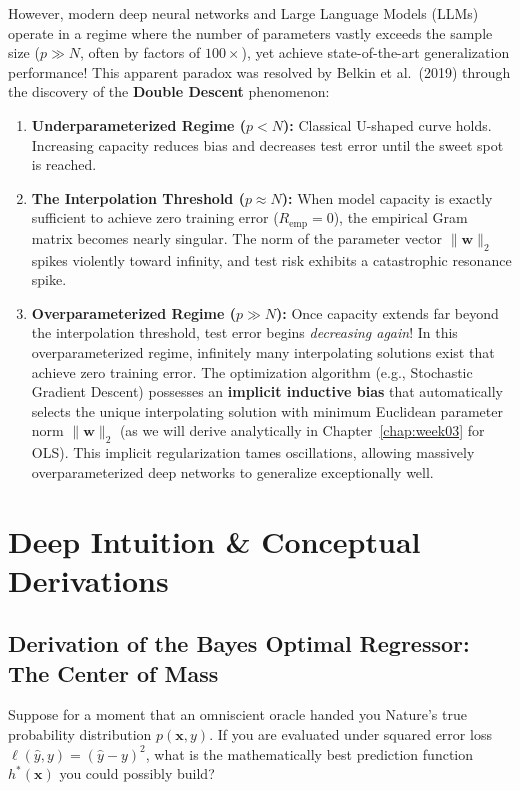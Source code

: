 However, modern deep neural networks and Large Language Models (LLMs) operate in a regime where the number of parameters vastly exceeds the sample size ($p \gg N$, often by factors of $100\times$), yet achieve state-of-the-art generalization performance! This apparent paradox was resolved by Belkin et al.\ (2019) through the discovery of the \textbf{Double Descent} phenomenon:
\begin{enumerate}
    \item \textbf{Underparameterized Regime ($p < N$):} Classical U-shaped curve holds. Increasing capacity reduces bias and decreases test error until the sweet spot is reached.
    \item \textbf{The Interpolation Threshold ($p \approx N$):} When model capacity is exactly sufficient to achieve zero training error ($R_{\text{emp}} = 0$), the empirical Gram matrix becomes nearly singular. The norm of the parameter vector $\|\mathbf{w}\|_2$ spikes violently toward infinity, and test risk exhibits a catastrophic resonance spike.
    \item \textbf{Overparameterized Regime ($p \gg N$):} Once capacity extends far beyond the interpolation threshold, test error begins \emph{decreasing again}! In this overparameterized regime, infinitely many interpolating solutions exist that achieve zero training error. The optimization algorithm (e.g., Stochastic Gradient Descent) possesses an \textbf{implicit inductive bias} that automatically selects the unique interpolating solution with minimum Euclidean parameter norm $\|\mathbf{w}\|_2$ (as we will derive analytically in Chapter~\ref{chap:week03} for OLS). This implicit regularization tames oscillations, allowing massively overparameterized deep networks to generalize exceptionally well.
\end{enumerate}


\section{Deep Intuition \& Conceptual Derivations}

\subsection{Derivation of the Bayes Optimal Regressor: The Center of Mass}
Suppose for a moment that an omniscient oracle handed you Nature's true probability distribution $p(\mathbf{x}, y)$. If you are evaluated under squared error loss $\ell(\hat{y}, y) = (\hat{y} - y)^2$, what is the mathematically best prediction function $h^*(\mathbf{x})$ you could possibly build?

